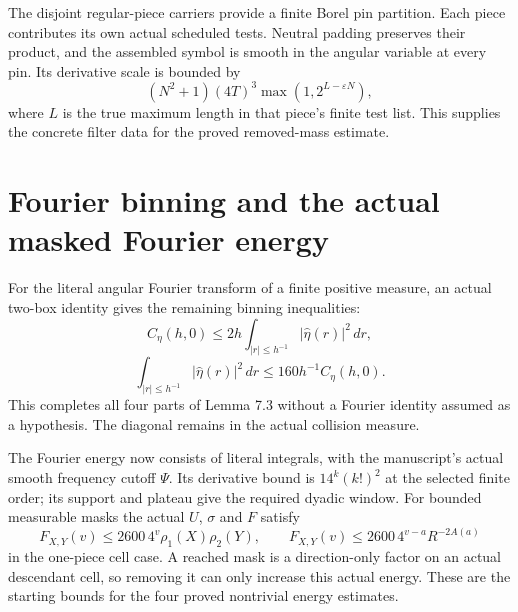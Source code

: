 \documentclass[11pt]{article}
\begin{document}
The disjoint regular-piece carriers provide a finite Borel pin partition.
Each piece contributes its own actual scheduled tests. Neutral padding
preserves their product, and the assembled symbol is smooth in the angular
variable at every pin. Its derivative scale is bounded by
\[
(N^2+1)(4T)^3\max(1,2^{L-\varepsilon N}),
\]
where $L$ is the true maximum length in that piece's finite test list. This
supplies the concrete filter data for the proved removed-mass estimate.

\newpage
\section*{Fourier binning and the actual masked Fourier energy}
For the literal angular Fourier transform of a finite positive measure,
an actual two-box identity gives the remaining binning inequalities:
\[
C_\eta(h,0)\le2h\int_{|r|\le h^{-1}}|\widehat\eta(r)|^2\,dr,
\]
\[
\int_{|r|\le h^{-1}}|\widehat\eta(r)|^2\,dr
\le160h^{-1}C_\eta(h,0).
\]
This completes all four parts of Lemma 7.3 without a Fourier identity assumed
as a hypothesis. The diagonal remains in the actual collision measure.

The Fourier energy now consists of literal integrals, with the manuscript's
actual smooth frequency cutoff $\Psi$. Its derivative bound is $14^k(k!)^2$
at the selected finite order; its support and plateau give the required
dyadic window. For bounded measurable masks the actual $U$, $\sigma$ and $F$ satisfy
\[
F_{X,Y}(v)\le2600\,4^v\rho_1(X)\rho_2(Y),
\qquad F_{X,Y}(v)\le2600\,4^{v-a}R^{-2A(a)}
\]
in the one-piece cell case. A reached mask is a direction-only factor on an
actual descendant cell, so removing it can only increase this actual energy.
These are the starting bounds for the four proved nontrivial energy estimates.

\newpage
\end{document}
